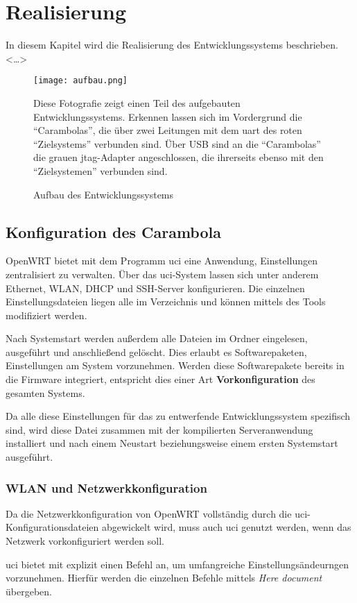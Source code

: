 \chapter{Realisierung}
\minitoc
In diesem Kapitel wird die Realisierung des Entwicklungssystems
beschrieben. <\ldots>
\begin{figure}[!ht]
\centering
\texttt{[image: aufbau.png]}
\caption{Aufbau des Entwicklungssystems}{Diese Fotografie zeigt einen
Teil des aufgebauten Entwicklungssystems. Erkennen lassen sich im
Vordergrund die "`Carambolas"', die über zwei Leitungen mit dem \gls{uart} des
roten "`Zielsystems"' verbunden sind. Über USB sind an die "`Carambolas"' die
grauen \gls{jtag}-Adapter angeschlossen, die ihrerseits ebenso mit den
"`Zielsystemen"' verbunden sind.}
\label{fig:aufbau}
\end{figure}
\section{Konfiguration des Carambola}\label{sec:conf}
OpenWRT bietet mit dem Programm \gls{uci} eine Anwendung, Einstellungen
zentralisiert zu verwalten. Über das \gls{uci}-System lassen sich unter anderem
Ethernet, WLAN, DHCP und SSH-Server konfigurieren. Die einzelnen
Einstellungsdateien liegen alle im Verzeichnis  und
können mittels des Tools modifiziert werden.

Nach Systemstart werden außerdem alle Dateien im Ordner
 eingelesen, ausgeführt und anschließend gelöscht.
Dies erlaubt es Softwarepaketen, Einstellungen am System vorzunehmen. Werden
diese Softwarepakete bereits in die Firmware integriert, entspricht dies einer
Art \textbf{Vorkonfiguration} des gesamten Systems.

Da alle diese Einstellungen für das zu entwerfende Entwicklungssystem spezifisch
sind, wird diese Datei zusammen mit der kompilierten Serveranwendung installiert
und nach einem Neustart beziehungsweise einem ersten Systemstart ausgeführt.
\subsection{WLAN und Netzwerkkonfiguration}
Da die Netzwerkkonfiguration von OpenWRT vollständig durch die
\gls{uci}-Konfigurationsdateien abgewickelt wird, muss auch \gls{uci} genutzt
werden, wenn das Netzwerk vorkonfiguriert werden soll.

\gls{uci} bietet mit  explizit einen Befehl an, um
umfangreiche Einstellungsändeurngen vorzunehmen. Hierfür werden die einzelnen
Befehle mittels \emph{Here document} übergeben.

